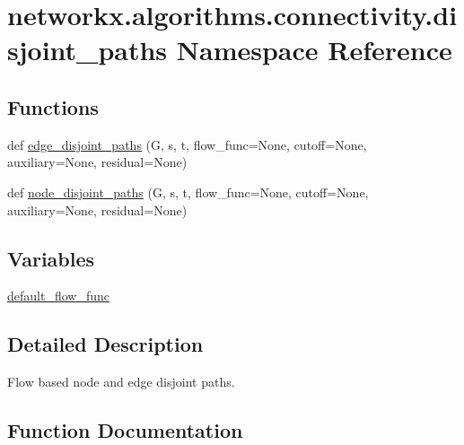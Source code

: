 \hypertarget{namespacenetworkx_1_1algorithms_1_1connectivity_1_1disjoint__paths}{}\section{networkx.\+algorithms.\+connectivity.\+disjoint\+\_\+paths Namespace Reference}
\label{namespacenetworkx_1_1algorithms_1_1connectivity_1_1disjoint__paths}
\subsection*{Functions}
\begin{DoxyCompactItemize}
\item 
def \hyperlink{namespacenetworkx_1_1algorithms_1_1connectivity_1_1disjoint__paths_a1d04acc947f4d846d14e92dc66ca9ca0}{edge\+\_\+disjoint\+\_\+paths} (G, s, t, flow\+\_\+func=None, cutoff=None, auxiliary=None, residual=None)
\item 
def \hyperlink{namespacenetworkx_1_1algorithms_1_1connectivity_1_1disjoint__paths_ae14d0a076c9fd5d5cd896c9cec35d074}{node\+\_\+disjoint\+\_\+paths} (G, s, t, flow\+\_\+func=None, cutoff=None, auxiliary=None, residual=None)
\end{DoxyCompactItemize}
\subsection*{Variables}
\begin{DoxyCompactItemize}
\item 
\hyperlink{namespacenetworkx_1_1algorithms_1_1connectivity_1_1disjoint__paths_a8dc00efc17a5a7a103e83a2b7f66d747}{default\+\_\+flow\+\_\+func}
\end{DoxyCompactItemize}


\subsection{Detailed Description}
\begin{DoxyVerb}Flow based node and edge disjoint paths.\end{DoxyVerb}
 

\subsection{Function Documentation}
\mbox{\label{namespacenetworkx_1_1algorithms_1_1connectivity_1_1disjoint__paths_a1d04acc947f4d846d14e92dc66ca9ca0}} 
